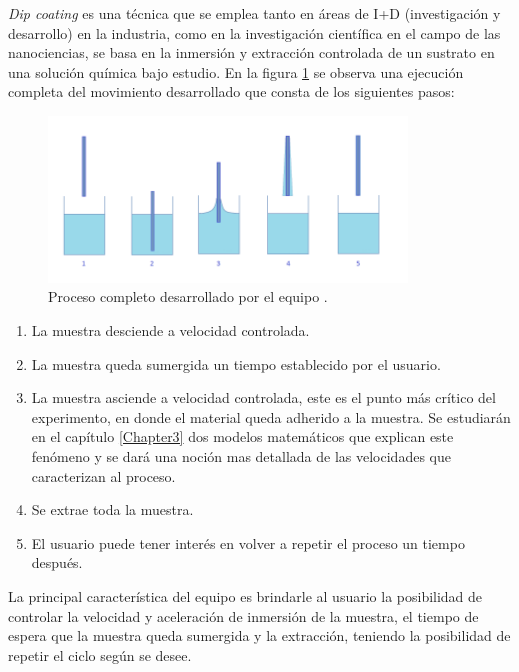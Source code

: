\textit{Dip coating} es una técnica que se emplea tanto en áreas de I+D (investigación y desarrollo) en la industria, como en la investigación científica en el campo de las nanociencias, se basa en la inmersión y extracción  controlada de un sustrato en una solución química bajo estudio. En la figura \ref{fig:inmersion} se observa una ejecución completa del movimiento desarrollado que consta de los siguientes pasos:


\begin{figure}[htpb]
\centering 
\includegraphics[width=0.85\textwidth]{./Figures/dip-coating.png}
\caption{Proceso completo desarrollado por el equipo \protect\footnotemark.}
\label{fig:inmersion}
\end{figure}

\begin{enumerate}
\item La muestra desciende a velocidad controlada.
\item La muestra queda sumergida un tiempo establecido por el usuario.	
\item La muestra asciende a velocidad controlada, este es el punto más crítico del experimento, en donde el material queda adherido a la muestra. Se estudiarán en el capítulo \ref{Chapter3} dos modelos matemáticos que explican este fenómeno y se dará una noción mas detallada de las velocidades que caracterizan al proceso.
\item Se extrae toda la muestra.
\item El usuario puede tener interés en volver a repetir el proceso un tiempo después.
\end{enumerate} 
 
La principal característica del equipo es brindarle al usuario la posibilidad de controlar la velocidad y aceleración de inmersión de la muestra, el tiempo de espera que la muestra queda sumergida y la extracción, teniendo la posibilidad de repetir el ciclo según se desee.

